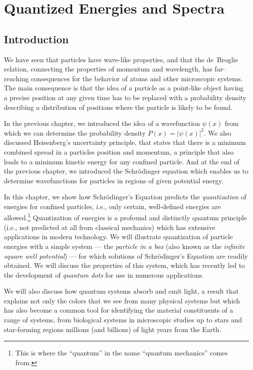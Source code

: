 \chapter[Quantized Energies and Spectra]{Quantized Energies and Spectra}
\label{chapter:quantized_energies}

\section{Introduction}
\label{sec:quantized_energies_intro}

\indent We have seen that particles have wave-like
properties, and that the de~Broglie relation, connecting the
properties of momentum and wavelength, has far-reaching consequences
for the behavior of atoms and other microscopic systems. 
The main consequence is that the idea of a particle as a
point-like object having a precise position at any given time has to
be replaced with a probability density describing a distribution of
positions where the particle is likely to be found. 

In the previous chapter, we introduced the idea of a wavefunction
$\psi(x)$ from which we can determine the probability density
$P(x) = |\psi(x)|^2$. We also discussed Heisenberg's uncertainty
principle, that states that there is a minimum combined spread in 
a particles position and momentum, a principle that also leads to
a minimum kinetic energy for any confined particle.
And at the end of the previous chapter, we
introduced the Schr\"odinger equation which enables us to determine
wavefunctions for particles in regions of given potential energy.

In this chapter, we show how Schr\"odinger's Equation predicts
the {\it quantization} of energies for confined particles, i.e., only
certain, well-defined energies are allowed.\footnote{This
is where the ``quantum'' in the name ``quantum mechanics'' comes from.}
Quantization of energies is a profound and distinctly quantum principle
(i.e., not predicted at all from classical mechanics) which has extensive
applications in modern technology. We will illustrate quantization of
particle energies with a simple system --- the {\it particle in a box} (also
known as the {\it infinite square well potential}) --- for which
solutions of Schr\"odinger's Equation are readily obtained. 
We will discuss the properties of this system, which has recently
led to the development of {\it quantum dots} for use in numerous
applications.  

We will also discuss how quantum systems absorb and emit
light, a result that explains not only the colors that we see from
many physical systems but which has also become a common tool for
identifying the material constituents of a range of systems, from
biological systems in microscopic studies up to stars 
and star-forming regions
millions (and billions) of light years from the Earth.

